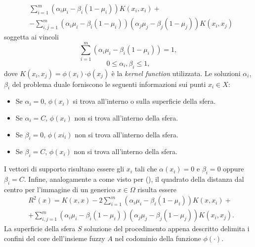 \documentclass [11pt,a4paper,twoside,openright] {book}
\begin{document}
\begin{equation}
\begin{split}
& \sum_{i=1}^m (\alpha_i\mu_i - \beta_i(1 - \mu_i))K(x_i,x_i) + \\
& -\sum_{i,j=1}^m (\alpha_i\mu_i - \beta_i(1-\mu_i))(\alpha_j\mu_j - \beta_j(1-\mu_j))K(x_i,x_j)
\end{split}
\end{equation}
soggetta ai vincoli
\begin{equation}
\sum_{i=1}^m (\alpha_i\mu_i - \beta_i(1 - \mu_i)) = 1,
\end{equation}
\begin{equation}
0 \leq \alpha_i,\beta_i \leq 1,
\end{equation}
dove $K(x_i,x_j) = \phi(x_i) \boldsymbol{\cdot} \phi(x_j)$ è la \textit{kernel function} utilizzata.
Le soluzioni $\alpha_i$, $\beta_i$ del problema duale forniscono le seguenti informazioni sui punti $x_i \in X$:
\begin{itemize}
\item Se $\alpha_i=0$, $\phi(x_i)$ si trova all'interno o sulla superficie della sfera.
\item Se $\alpha_i=C$, $\phi(x_i)$ non si trova all'interno della sfera.
\item Se $\beta_i=0$, $\phi(xi_i)$ non si trova all'interno della sfera.
\item Se $\beta_i=C$, $\phi(x_i)$ non si trova all'interno della sfera.
\end{itemize}
I vettori di supporto risultano essere gli $x_i$ tali che $\alpha(x_i) = 0$ e $\beta_i = 0$ oppure $\beta_i = C$.
Infine, analogamente a come visto per (), il quadrato della distanza dal centro per l'immagine di un generico $x \in \Omega$ risulta essere
\begin{equation}
\begin{split}
& R^2(x) = K(x,x) - 2\sum_{i=1}^m (\alpha_i\mu_i - \beta_i(1 - \mu_i))K(x,x_i) + \\
& + \sum_{i,j=1}^m (\alpha_i\mu_i - \beta_i(1-\mu_i))(\alpha_j\mu_j - \beta_j(1-\mu_j))K(x_i,x_j).
\end{split}
\end{equation}
La superficie della sfera $S$ soluzione del procedimento appena descritto delimita i confini del core dell'insieme fuzzy $A$ nel codominio della funzione $\phi(\cdot)$.
\end{document}

